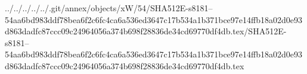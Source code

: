 ../../../../../.git/annex/objects/xW/54/SHA512E-s8181--54aa6bd983ddf78bea6f2c6fc4ca6a536ed3647c17b534a1b371bce97e14ffb18a02d0e93d863dadfc87ccc09c24964056a374b698f28836de34cd69770df4db.tex/SHA512E-s8181--54aa6bd983ddf78bea6f2c6fc4ca6a536ed3647c17b534a1b371bce97e14ffb18a02d0e93d863dadfc87ccc09c24964056a374b698f28836de34cd69770df4db.tex